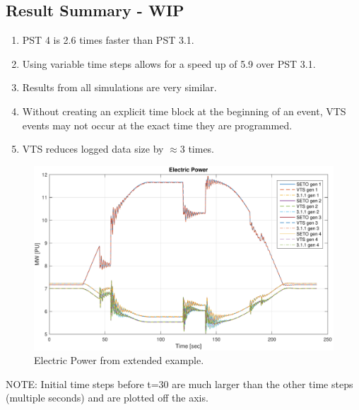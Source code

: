 \pagebreak
\subsection{Result Summary - WIP} 
\begin{enumerate}
 em
\item PST 4 is 2.6 times faster than PST 3.1.
\item Using variable time steps allows for a speed up of 5.9 over PST 3.1.
\item Results from all simulations are very similar.
\item Without creating an explicit time block at the beginning of an event, VTS events may not occur at the exact time they are programmed.
\item VTS reduces logged data size by $\approx$3 times.
\end{enumerate}




\begin{figure}[H]
	\centering
	\footnotesize
	\includegraphics[width=\linewidth]{examples/extendedTerm/extended-7}
	\caption{Electric Power from extended example.}
	\label{fig: extended 7}
\end{figure}%


\pagebreak

NOTE: Initial time steps before t=30 are much larger than the other time steps (multiple seconds) and are plotted off the axis.

